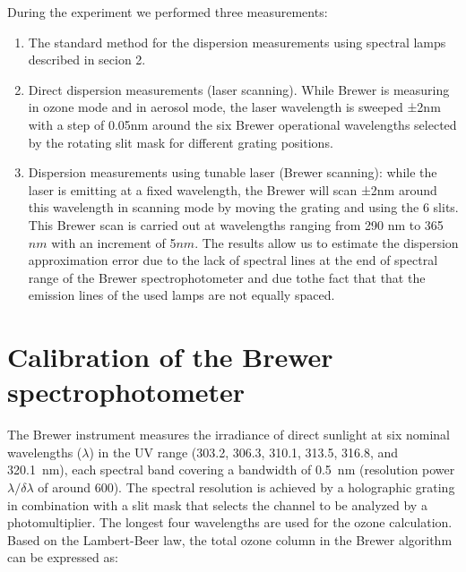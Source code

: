 \documentclass[acp, manuscript]{copernicus}
\begin{document}

During the experiment we performed three measurements: 
\begin{enumerate}


\item The standard method for the dispersion measurements using spectral lamps described in secion 2.

\item  Direct dispersion measurements (laser scanning). 
While Brewer is measuring in ozone mode and in aerosol mode, the laser wavelength is sweeped ±2\unit{nm} with a step of 0.05\unit{nm} around the six Brewer operational wavelengths selected by the rotating slit mask for different grating positions.



\item  Dispersion measurements using tunable laser (Brewer scanning): while the laser is emitting at a fixed wavelength, the Brewer will scan ±2\unit{nm} around this wavelength in scanning mode by moving the grating and using the 6 slits. This Brewer scan is carried out at wavelengths ranging from 290 \unit{nm} to 365 $\unit{nm}$ with an increment of 5$\unit{nm}$.  The results allow us to estimate the dispersion approximation error due to the lack of spectral lines at the end of spectral range of the Brewer spectrophotometer and due tothe fact that that the emission lines of the used lamps are not equally spaced.

\end{enumerate}







\section{Calibration of the Brewer spectrophotometer}
\label{sec:calibration}


The Brewer instrument measures the irradiance of direct sunlight at six nominal wavelengths ($\lambda$) in the UV range (303.2, 306.3, 310.1, 313.5, 316.8, and 320.1~\unit{nm}), each spectral band covering a bandwidth of 0.5~\unit{nm} (resolution power $\lambda/\delta\lambda$ of around 600). The spectral resolution is achieved by a holographic grating in combination with a slit mask that selects the channel to be analyzed by a photomultiplier. The longest four wavelengths are used for the ozone calculation. Based on the Lambert-Beer law, the total ozone column in the Brewer algorithm can be expressed as:
\end{document}
